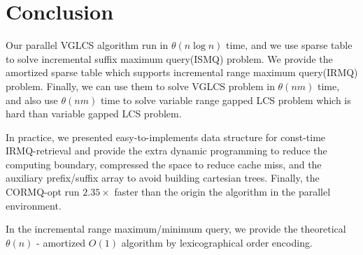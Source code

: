 \section{Conclusion}
\label{sec:Conclusion}

Our parallel VGLCS algorithm run in $\theta(n \log n)$ time, and we
use sparse table to solve incremental suffix maximum query(ISMQ)
problem.  We provide the amortized sparse table which supports
incremental range maximum query(IRMQ) problem.  Finally, we can use
them to solve VGLCS problem in $\theta(nm)$ time, and also use
$\theta(nm)$ time to solve variable range gapped LCS problem which is
hard than variable gapped LCS problem.

In practice, we presented easy-to-implements data structure for
const-time IRMQ-retrieval and provide the extra dynamic programming to
reduce the computing boundary, compressed the space to reduce cache
miss, and the auxiliary prefix/suffix array to avoid building
cartesian trees. Finally, the CORMQ-opt run $2.35 \times$ faster than
the origin the algorithm in the parallel environment.

In the incremental range maximum/minimum query, we provide the
theoretical $\theta(n)$ - amortized $O(1)$ algorithm by
lexicographical order encoding.

\iffalse
我們修改 VGLCS 的序列算法，將其平行化於 $\theta(n \log n)$ 時間內，
並以稀疏表實作 ISMQ 問題。提出的稀疏表能解決比 VGLCS 更困難的 Variable Range Gapped LCS，
致使 VIGLCS 可在時間複雜度 $\theta(nm)$ 被解決。

在實務上，我們提供以動態規劃減少計算量，以及使用空間壓縮降低快取未中的策略，
最終平行 RMQ 獲取 $2.35 \times$ 倍的加速；在增長區間最大值詢問 (IRMQ) 問題中，
以字典順序的編碼策略，提出理論 $\theta(n)$ -- amortized $\theta(1)$  的算法。
\fi